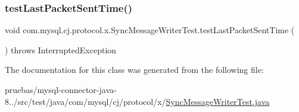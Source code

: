 \subsubsection{\texorpdfstring{test\+Last\+Packet\+Sent\+Time()}{testLastPacketSentTime()}}
{\footnotesize\ttfamily void com.\+mysql.\+cj.\+protocol.\+x.\+Sync\+Message\+Writer\+Test.\+test\+Last\+Packet\+Sent\+Time (\begin{DoxyParamCaption}{ }\end{DoxyParamCaption}) throws Interrupted\+Exception}



The documentation for this class was generated from the following file\+:\begin{DoxyCompactItemize}
\item 
pruebas/mysql-\/connector-\/java-\/8../src/test/java/com/mysql/cj/protocol/x/\mbox{\hyperlink{_sync_message_writer_test_8java}{Sync\+Message\+Writer\+Test.\+java}}\end{DoxyCompactItemize}

